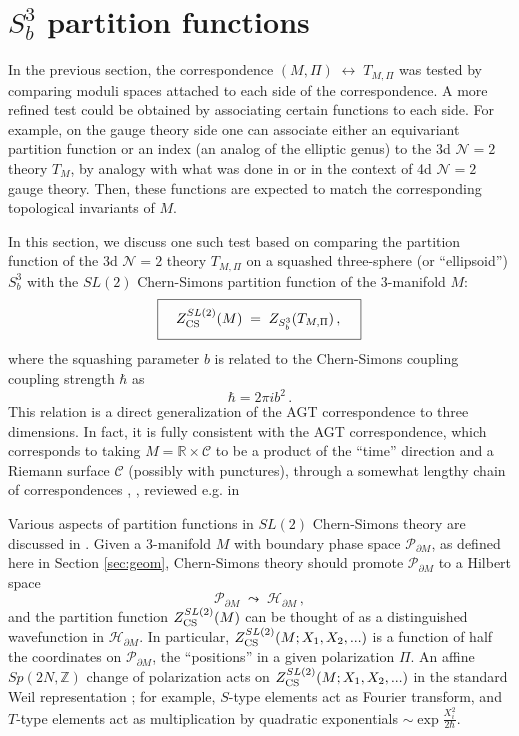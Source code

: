 \documentclass[hyper,letterpaper]{JHEP3}
\numberwithin{equation}{section}
\newcommand{\be}{\begin{equation}}
\newcommand{\ee}{\end{equation}}
\newcommand{\Z}{{\mathbb Z}}
\newcommand{\R}{{\mathbb R}}
\newcommand{\pd}{\partial}
\newcommand{\CC}{\mathcal{C}}
\newcommand{\CH}{\mathcal{H}}
\newcommand{\CN}{\mathcal{N}}
\newcommand{\CP}{\mathcal{P}}
\begin{document}

\section{$S^3_b$ partition functions}
\label{sec:S3b}

In the previous section, the correspondence $(M,\Pi) \; \leftrightarrow \; T_{M,\Pi}$
was tested by comparing moduli spaces attached to each side of the correspondence.
A more refined test could be obtained by associating certain functions to each side.
For example, on the gauge theory side one can associate either an equivariant partition
function or an index (an analog of the elliptic genus) to the 3d $\CN=2$ theory $T_M$,
by analogy with what was done in \cite{AGT} or \cite{Rastelli-2dQFT, Rastelli-qYM} in the context of 4d $\CN=2$ gauge theory.
Then, these functions are expected to match the corresponding topological invariants of $M$.

In this section, we discuss one such test based on comparing the
partition function of the 3d $\CN=2$ theory $T_{M,\Pi}$ on a squashed three-sphere (or ``ellipsoid'') $S^3_b$
with the $SL(2)$ Chern-Simons partition function of the 3-manifold $M$:
%
\be
\boxed{\phantom{\int}
Z^{SL(2)}_{\rm CS} (M) \; = \; Z_{S^3_b} (T_{M,\Pi})\,,
\phantom{\int}}
\label{ZZclaim}
\ee
%
where the squashing parameter $b$ is related to the Chern-Simons coupling coupling strength $\hbar$ as
%
\be \hbar = 2\pi ib^2\,. \ee
%
This relation is a direct generalization of the AGT correspondence \cite{AGT} to three dimensions.
In fact, it is fully consistent with the AGT correspondence, which corresponds to taking $M = \R \times \CC$
to be a product of the ``time'' direction and a Riemann surface $\CC$ (possibly with punctures),
through a somewhat lengthy chain of correspondences \cite{DGG-defects}, \cite{DG-Sdual}, reviewed e.g. in \cite{Yamazaki-3d}


Various aspects of partition functions in $SL(2)$ Chern-Simons theory are discussed in \cite{gukov-2003, DGLZ, Wit-anal, Dimofte-QRS}. Given a 3-manifold $M$ with boundary phase space $\CP_{\pd M}$, as defined here in Section \ref{sec:geom}, Chern-Simons theory should promote $\CP_{\pd M}$ to a Hilbert space
%
\be \CP_{\pd M}\;\leadsto\; \CH_{\pd M}\,, \label{HdM} \ee
%
and the partition function $Z^{SL(2)}_{\rm CS}(M)$ can be thought of as a distinguished wavefunction in $\CH_{\pd M}$. In particular, $Z^{SL(2)}_{\rm CS}(M;X_1,X_2,...)$ is a function of half the coordinates on $\CP_{\pd M}$, the ``positions'' in a given polarization $\Pi$. An affine $Sp(2N,\Z)$ change of polarization acts on $Z^{SL(2)}_{\rm CS}(M;X_1,X_2,...)$ in the standard Weil representation \cite{Shale-rep, Weil-rep}; for example, $S$-type elements act as Fourier transform, and $T$-type elements act as multiplication by quadratic exponentials $\sim \exp \frac{X_i^2}{2\hbar}$.
\end{document}
